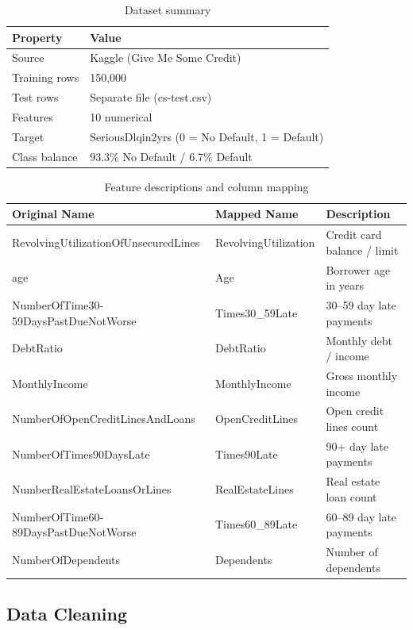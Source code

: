 \documentclass[12pt, a4paper]{article}
\begin{document}
\begin{table}[H]
\centering
\begin{tabular}{ll}
\toprule
\textbf{Property} & \textbf{Value} \\
\midrule
Source & Kaggle (Give Me Some Credit) \\
Training rows & 150,000 \\
Test rows & Separate file (cs-test.csv) \\
Features & 10 numerical \\
Target & SeriousDlqin2yrs (0 = No Default, 1 = Default) \\
Class balance & 93.3\% No Default / 6.7\% Default \\
\bottomrule
\end{tabular}
\caption{Dataset summary}
\end{table}

\begin{table}[H]
\centering
\small
\begin{tabular}{lll}
\toprule
\textbf{Original Name} & \textbf{Mapped Name} & \textbf{Description} \\
\midrule
RevolvingUtilizationOfUnsecuredLines & RevolvingUtilization & Credit card balance / limit \\
age & Age & Borrower age in years \\
NumberOfTime30-59DaysPastDueNotWorse & Times30\_59Late & 30--59 day late payments \\
DebtRatio & DebtRatio & Monthly debt / income \\
MonthlyIncome & MonthlyIncome & Gross monthly income \\
NumberOfOpenCreditLinesAndLoans & OpenCreditLines & Open credit lines count \\
NumberOfTimes90DaysLate & Times90Late & 90+ day late payments \\
NumberRealEstateLoansOrLines & RealEstateLines & Real estate loan count \\
NumberOfTime60-89DaysPastDueNotWorse & Times60\_89Late & 60--89 day late payments \\
NumberOfDependents & Dependents & Number of dependents \\
\bottomrule
\end{tabular}
\caption{Feature descriptions and column mapping}
\end{table}

\newpage

\subsection{Data Cleaning}
\end{document}
